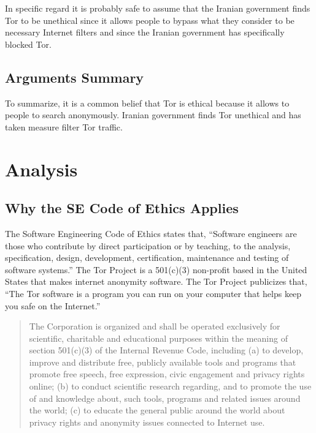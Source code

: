 \documentclass[11pt]{article}
\begin{document}
\begin{multicols}{2}
In specific regard it is probably safe to assume that the Iranian government
finds Tor to be unethical since it allows people to bypass what they consider to
be necessary Internet filters and since the Iranian government has specifically
blocked Tor\cite{IranBlocksTorSameDayFix}.


\subsection{Arguments Summary}

To summarize, it is a common belief that Tor is ethical because it allows to
people to search anonymously. Iranian government finds Tor unethical and has
taken measure filter Tor traffic.




\section{Analysis}

\subsection{Why the SE Code of Ethics Applies} 

The Software Engineering Code of Ethics states that, ``Software engineers are
those who contribute by direct participation or by teaching, to the analysis,
specification, design, development, certification, maintenance and testing of
software systems.'' \cite{SE:CodeOfEthics} The Tor Project is a 501(c)(3)
non-profit based in the United States that makes internet anonymity
software.\cite{Tor:FAQ, Tor:CorePeople} The Tor Project publicizes that, ``The
Tor software is a program you can run on your computer that helps keep you safe
on the Internet.''\cite{Tor:FAQ} 

\begin{quotation}
  The Corporation is organized and shall be operated exclusively for scientific,
  charitable and educational purposes within the meaning of section 501(c)(3) of
  the Internal Revenue Code, including (a) to develop, improve and distribute
  free, publicly available tools and programs that promote free speech, free
  expression, civic engagement and privacy rights online; (b) to conduct
  scientific research regarding, and to promote the use of and knowledge about,
  such tools, programs and related issues around the world; (c) to educate the
  general public around the world about privacy rights and anonymity issues
  connected to Internet use.
  \cite{TOR:Sponsorship}
\end{quotation}
  

\end{multicols}
\end{document}
